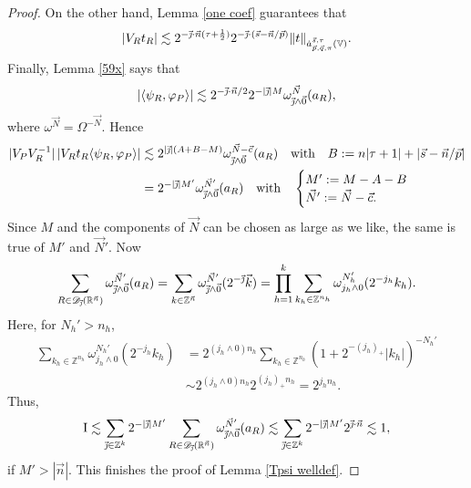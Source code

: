 \documentclass[11pt, reqno]{amsart}
\theoremstyle{definition}
\theoremstyle{remark}
\numberwithin{equation}{section}
\newcommand{\D}{\mathscr D}
\newcommand{\R}{\mathbb R}
\newcommand{\V}{\mathbb V}
\newcommand{\Z}{\mathbb Z}
\newcommand{\vnull}{\vec 0}
\newcommand{\vc}{\vec c}
\newcommand{\vj}{\vec{\textit{\j}}}
\newcommand{\vk}{\vec{k}}
\newcommand{\vn}{\vec n}
\newcommand{\vN}{\vec N}
\newcommand{\vp}{\vec p}
\newcommand{\vq}{\vec q}
\newcommand{\vs}{\vec s}
\newcommand{\atau}{\dot a^{\vs,\tau}_{\vp,\vq,\pi}}
\newcommand{\pair}[2]{\langle #1, #2 \rangle}
\newcommand{\abs}[1]{|#1|}
\newcommand{\Norm}[2]{\|#1\|_{#2}}
\begin{document}
\begin{proof}
On the other hand, Lemma \ref{one coef} guarantees that
\begin{equation*}
  \abs{V_R t_R}
  \lesssim 2^{-\vj\cdot\vn(\tau+\frac12)}
  2^{-\vj\cdot(\vs-\vn/\vp)}
  \Norm{t}{\atau(\V)}.
\end{equation*}
Finally, Lemma \ref{59x} says that
\begin{equation*}
   \abs{\pair{\psi_R}{\varphi_P}}\lesssim 2^{-\vj\cdot\vn/2}2^{-\abs{\vj}M}\omega_{\vj\wedge\vnull}^{\vN}(a_R),
\end{equation*}
where $\omega^{\vN}=\Omega^{-\vN}$. Hence
\begin{equation*}
\begin{split}
  |V_PV_R^{-1}| \, |V_R t_R\pair{\psi_R}{\varphi_P}|
  &\lesssim 2^{\abs{\vj}(A+B-M)}\omega_{\vj\wedge\vnull}^{\vN-\vc}(a_R)\quad
  \text{with}\quad B:=n |\tau+1|+\abs{\vs-\vn/\vp} \\
  &=2^{-\abs{\vj}M'}\omega_{\vj\wedge\vnull}^{\vN'}(a_R)\quad
  \text{with}\quad \begin{cases} M':=M-A-B\\ \vN':=\vN-\vc.\end{cases}
\end{split}
\end{equation*}
Since $M$ and the components of $\vN$ can be chosen as large as we like, the same is true of $M'$ and $\vN'$. Now
\begin{equation*}
\sum_{R\in\D_{\vj}(\R^{\vn})}\omega_{\vj\wedge\vnull}^{\vN'}(a_R)
=\sum_{k\in\Z^{\vn}}\omega_{\vj\wedge\vnull}^{\vN'}(2^{-\vj}\vk)
=\prod_{h=1}^k\sum_{k_h\in\Z^{n_h}}\omega_{j_h\wedge 0}^{N_h'}(2^{-j_h}k_h).
\end{equation*}
Here, for $N_h'>n_h$,
\begin{equation*}
\begin{split}
\sum_{k_h\in\Z^{n_h}}\omega_{j_h\wedge 0}^{N_h'}(2^{-j_h}k_h)
&=2^{(j_h\wedge 0) n_h}\sum_{k_h\in\Z^{n_h}}(1+2^{-(j_h)_+}\abs{k_h})^{-N_h'} \\
&\sim 2^{(j_h\wedge 0) n_h} 2^{(j_h)_+ n_h}=2^{j_h n_h}.
\end{split}
\end{equation*}
Thus,
\begin{equation*}
\begin{split}
\mathrm{I}
\lesssim\sum_{\vj\in\Z^k}2^{-\abs{\vj}M'}\sum_{R\in\D_{\vj}(\R^{\vn})}\omega_{\vj\wedge\vnull}^{\vN'}(a_R)
\lesssim\sum_{\vj\in\Z^k}2^{-\abs{\vj}M'}2^{\vj\cdot\vn}\lesssim1,
\end{split}
\end{equation*}
if $M'>\abs{\vn}$.
This finishes the proof of Lemma \ref{Tpsi welldef}.
\end{proof}
\end{document}
